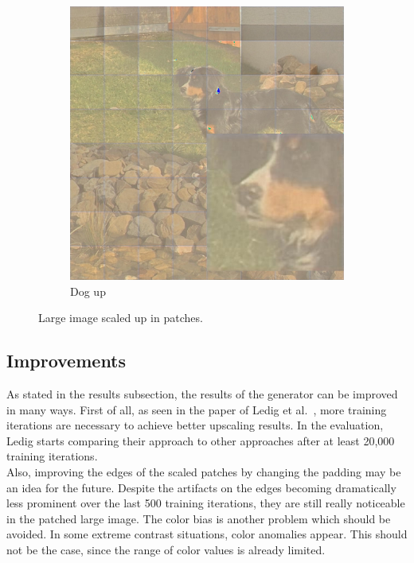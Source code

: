 \documentclass[11pt,twocolumn,twoside,paper=a4]{IEEEtran}
\begin{document}
\begin{figure}
\begin{subfigure}{0.49\textwidth}
  \par\bigskip
  \begin{minipage}[b]{\textwidth}
    \includegraphics[width=\textwidth]{../images/dog_up.jpg}
    \caption{Dog up}
    \label{fig:dog_up}
  \end{minipage}
\end{subfigure}


\label{fig:large_image}
\caption{Large image scaled up in patches.}

    
\end{figure}

\subsection{Improvements}
As stated in the results subsection, the results of the generator can be improved in many ways. 
First of all, as seen in the paper of Ledig et al.~\cite{DBLP:journals/corr/LedigTHCATTWS16}, more training iterations are necessary to achieve better upscaling results.
In the evaluation, Ledig starts comparing their approach to other approaches after at least 20,000 training iterations.\\
Also, improving the edges of the scaled patches by changing the padding may be an idea for the future. Despite the artifacts on the edges becoming dramatically less prominent over the last 500 training
iterations, they are still really noticeable in the patched large image.
The color bias is another problem which should be avoided.
In some extreme contrast situations, color anomalies appear. This should not be the case, since the range of color values is already limited. 
\end{document}
